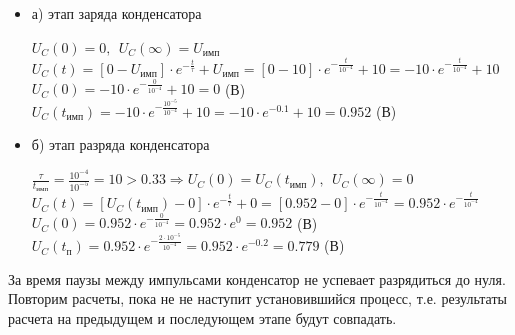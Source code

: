 		
\begin{itemize}
\item[] а) этап заряда конденсатора

		$U_C(0) = 0,\ \ U_C(\infty) = U_\text{имп}$\\	
		$U_C(t) = [0 - U_\text{имп}] \cdot e^{-\frac{t}{\tau}} + U_\text{имп} = [0 - 10] \cdot e^{-\frac{t}{10^{-4}}} + 10 = -10 \cdot e^{-\frac{t}{10^{-4}}} + 10$\\
		$U_C(0) = -10 \cdot e^{-\frac{0}{10^{-4}}} + 10 = 0$ (В)\\
		$U_C(t_\text{имп}) = -10 \cdot e^{-\frac{10^{-5}}{10^{-4}}} + 10 = -10 \cdot e^{-0.1} + 10 = 0.952$ (В)\\
		
\item[] б) этап разряда конденсатора
	
		$\frac{\tau}{t_\text{имп}} = \frac{10^{-4}}{10^{-5}} = 10 > 0.33 \Rightarrow U_C(0) = U_C(t_\text{имп}),\ \ U_C(\infty) = 0$\\
		$U_C(t) = [U_C(t_\text{имп}) - 0] \cdot e^{-\frac{t}{\tau}} + 0 =  [0.952 - 0] \cdot e^{-\frac{t}{10^{-4}}} = 0.952 \cdot e^{-\frac{t}{10^{-4}}}$\\
		$U_C(0) = 0.952 \cdot e^{-\frac{0}{10^{-4}}} = 0.952 \cdot e^0 = 0.952$ (В)\\
		$U_C(t_\text{п}) = 0.952 \cdot e^{-\frac{ 2 \cdot 10^{-5}}{10^{-4}}} = 0.952 \cdot e^{-0.2} = 0.779$ (В)\\
		
\end{itemize}				
		
За время паузы между импульсами конденсатор не успевает разрядиться до нуля. Повторим расчеты, пока не не наступит установившийся процесс, т.е. результаты расчета на предыдущем и последующем этапе будут совпадать.	
	
